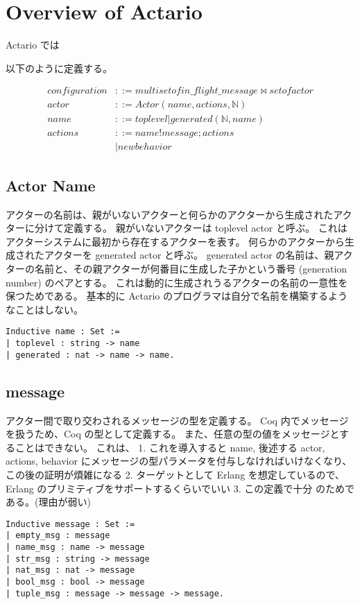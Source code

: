 \section{Overview of Actario}
\label{sec:overview}

Actario では

以下のように定義する。

\begin{align*}
  configuration & ::= multiset of in\_flight\_message \bowtie set of actor \\
  actor & ::= Actor(name, actions, \mathbb{N}) \\
  name & ::= toplevel | generated(\mathbb{N}, name) \\
  actions & ::= name ! message; actions \\
  & \mid new behavior
\end{align*}


\subsection{Actor Name}
アクターの名前は、親がいないアクターと何らかのアクターから生成されたアクターに分けて定義する。
親がいないアクターは toplevel actor と呼ぶ。
これはアクターシステムに最初から存在するアクターを表す。
何らかのアクターから生成されたアクターを generated actor と呼ぶ。
generated actor の名前は、親アクターの名前と、その親アクターが何番目に生成した子かという番号 (generation number) のペアとする。
これは動的に生成されうるアクターの名前の一意性を保つためである。
基本的に Actario のプログラマは自分で名前を構築するようなことはしない。

\begin{lstlisting}
Inductive name : Set :=
| toplevel : string -> name
| generated : nat -> name -> name.
\end{lstlisting}

\subsection{message}
アクター間で取り交わされるメッセージの型を定義する。
Coq 内でメッセージを扱うため、Coq の型として定義する。
また、任意の型の値をメッセージとすることはできない。
これは、
1. これを導入すると name, 後述する actor, actions, behavior にメッセージの型パラメータを付与しなければいけなくなり、この後の証明が煩雑になる
2. ターゲットとして Erlang を想定しているので、Erlang のプリミティブをサポートするくらいでいい
3. この定義で十分
のためである。(理由が弱い)

\begin{lstlisting}
Inductive message : Set :=
| empty_msg : message
| name_msg : name -> message
| str_msg : string -> message
| nat_msg : nat -> message
| bool_msg : bool -> message
| tuple_msg : message -> message -> message.
\end{lstlisting}

